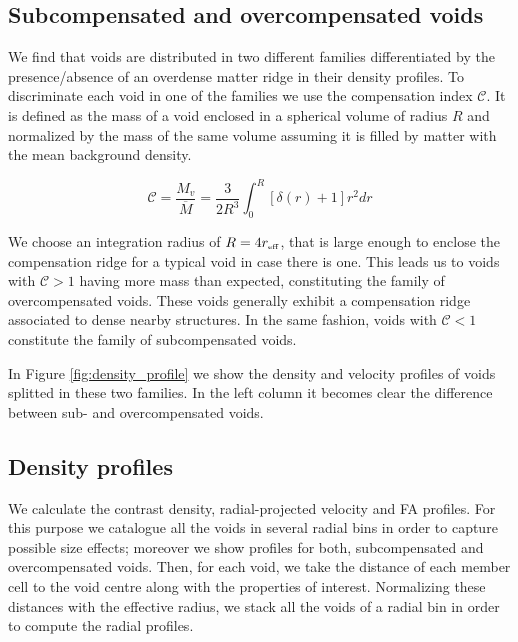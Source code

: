 \documentclass[a4,useAMS,usenatbib,usegraphicx]{mn2e}
\newcommand{\eq}[2]{\begin{equation} \label{eq:#1} #2 \end{equation}}
\newcommand{\reff}{{\ifmmode{r_{\mbox{\tiny eff}}}\else{$r_{\mbox{\tiny eff}}$}\fi}}
\begin{document}
\subsection{Subcompensated and overcompensated voids}
\label{subsec:enclosedmass}

We find that voids are distributed in two different  families
differentiated by the 
presence/absence of an overdense matter ridge in their density
profiles. 
To discriminate each void in one of the families we use the
compensation  index $\mathcal{C}$.
It is defined as the mass of a void enclosed in a spherical volume of
radius $R$ and normalized by the mass of the same volume assuming
it is filled by matter with the mean background density.

\eq{compensation}
{\mathcal{C} = \frac{M_v}{\overline{M}} = \frac{3}{2R^{3}} \int_0^{R} [\delta(r) + 1] r^2 dr}

We choose an integration radius of $R=4\reff$, that is large enough to 
enclose the compensation ridge for a typical void in case there is one. 
This leads us to voids with $\mathcal{C}>1$ having more mass than expected, 
constituting the family of overcompensated voids. 
These voids generally  exhibit a compensation ridge associated to
dense nearby structures. 
In the same fashion, voids with $\mathcal{C}<1$ constitute the family
of  subcompensated voids. 

In Figure \ref{fig:density_profile} we show the density and velocity profiles
of voids splitted in these two families. 
In the left column it becomes clear the difference between sub- and
overcompensated voids.

\subsection{Density profiles}
\label{subsec:density_voids}



We calculate the contrast density, radial-projected velocity and 
FA profiles. For this purpose we catalogue all the voids in several radial 
bins in order to capture possible size effects; moreover we show profiles 
for both, subcompensated and overcompensated voids. Then, for each void, 
we take the distance of each member cell to the void centre along with the 
properties of interest. Normalizing these distances with the effective 
radius, we stack all the voids of a radial bin in order to compute the 
radial profiles.
\end{document}
